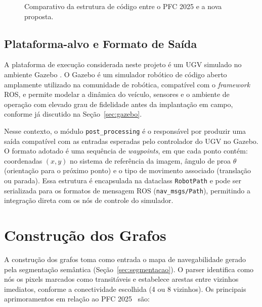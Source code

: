 \documentclass[
    12pt,
    openright,
    oneside,
    a4paper,
    english,
    brazil
]{abntex2}
\begin{document}
\begin{figure}[H]
{}
    \caption{Comparativo da estrutura de código entre o PFC 2025 \cite{camelo2025} e a nova proposta.}
    \label{fig:comparacao_arquitetura}
\end{figure}

\subsection{Plataforma-alvo e Formato de Saída}

A plataforma de execução considerada neste projeto é um UGV simulado no ambiente Gazebo \cite{koenig2004}. O Gazebo é um simulador robótico de código aberto amplamente utilizado na comunidade de robótica, compatível com o \textit{framework} ROS, e permite modelar a dinâmica do veículo, sensores e o ambiente de operação com elevado grau de fidelidade antes da implantação em campo, conforme já discutido na Seção~\ref{sec:gazebo}.

Nesse contexto, o módulo \texttt{post\_processing} é o responsável por produzir uma saída compatível com as entradas esperadas pelo controlador do UGV no Gazebo. O formato adotado é uma sequência de \textit{waypoints}, em que cada ponto contém: coordenadas $(x, y)$ no sistema de referência da imagem, ângulo de proa $\theta$ (orientação para o próximo ponto) e o tipo de movimento associado (translação ou parada). Essa estrutura é encapsulada na dataclass \texttt{RobotPath} e pode ser serializada para os formatos de mensagem ROS (\texttt{nav\_msgs/Path}), permitindo a integração direta com os nós de controle do simulador.

\section{Construção dos Grafos}

A construção dos grafos toma como entrada o mapa de navegabilidade gerado pela segmentação semântica (Seção~\ref{sec:segmentacao}). O parser identifica como nós os pixels marcados como transitáveis e estabelece arestas entre vizinhos imediatos, conforme a conectividade escolhida (4 ou 8 vizinhos). Os principais aprimoramentos em relação ao PFC 2025~\cite{camelo2025} são:
\end{document}
